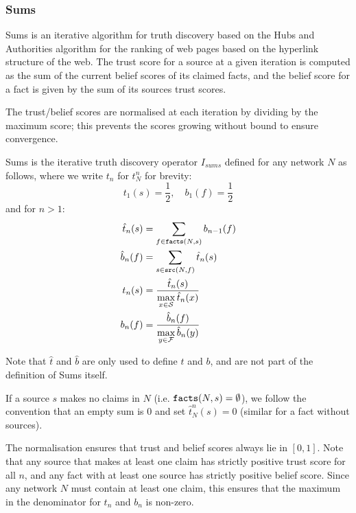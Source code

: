 \documentclass[../main.tex]{subfiles}
\begin{document}
\subsubsection*{Sums}

Sums \cite{pasternack} is an iterative algorithm for truth discovery based on
the Hubs and Authorities \cite{kleinberg} algorithm for the ranking of web
pages based on the hyperlink structure of the web. The trust score for a source
at a given iteration is computed as the sum of the current belief scores of its
claimed facts, and the belief score for a fact is given by the sum of its
sources trust scores.

The trust/belief scores are normalised at each iteration by dividing by the
maximum score; this prevents the scores growing without bound to ensure
convergence.

\begin{definition}[Sums]
Sums is the iterative truth discovery operator $I_{sums}$ defined for any
network $N$ as follows, where we write $t_n$ for $t_N^n$ for brevity:
\[
    t_1(s) = \frac{1}{2}, \quad b_1(f) = \frac{1}{2}
\]
and for $n > 1$:
\begin{align*}
    \hat{t}_n(s) & = \sum_{f \in \texttt{facts}(N, s)}{b_{n - 1}(f)} \\
    \hat{b}_n(f) & = \sum_{s \in \texttt{src}(N, f)}{\hat{t}_n(s)} \\
    t_n(s) & = \frac{\hat{t}_n(s)}{\max\limits_{x \in \mathcal{S}}{\hat{t}_n(x)}} \\
    b_n(f) & = \frac{\hat{b}_n(f)}{\max\limits_{y \in \mathcal{F}}{\hat{b}_n(y)}}
\end{align*}

Note that $\hat{t}$ and $\hat{b}$ are only used to define $t$ and $b$, and are
not part of the definition of Sums itself.

If a source $s$ makes no claims in $N$ (i.e. $\texttt{facts}(N, s) = \emptyset$), we
follow the convention that an empty sum is 0 and set $\hat{t}_N^n(s)=0$
(similar for a fact without sources).
\end{definition}

\begin{remark}
The normalisation ensures that trust and belief scores always lie in $[0, 1]$.
Note that any source that makes at least one claim has strictly positive trust
score for all $n$, and any fact with at least one source has strictly positive
belief score. Since any network $N$ must contain at least one claim, this
ensures that the maximum in the denominator for $t_n$ and $b_n$ is non-zero.
\end{remark}
\end{document}
